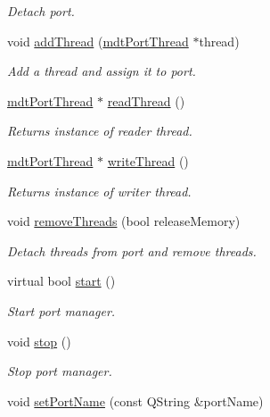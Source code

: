\begin{DoxyCompactItemize}
\begin{DoxyCompactList}\small\item\em Detach port. \end{DoxyCompactList}\item 
void \hyperlink{classmdt_port_manager_ab62591409d019a4a2576b4310c411b8f}{addThread} (\hyperlink{classmdt_port_thread}{mdtPortThread} $\ast$thread)
\begin{DoxyCompactList}\small\item\em Add a thread and assign it to port. \end{DoxyCompactList}\item 
\hyperlink{classmdt_port_thread}{mdtPortThread} $\ast$ \hyperlink{classmdt_port_manager_ad9233b5156a45f2684783317d75fdf9b}{readThread} ()
\begin{DoxyCompactList}\small\item\em Returns instance of reader thread. \end{DoxyCompactList}\item 
\hyperlink{classmdt_port_thread}{mdtPortThread} $\ast$ \hyperlink{classmdt_port_manager_af44b6e9876e6687b1d4fe7e05ffd5a91}{writeThread} ()
\begin{DoxyCompactList}\small\item\em Returns instance of writer thread. \end{DoxyCompactList}\item 
void \hyperlink{classmdt_port_manager_aaa0a474183bcae0fff4fb9ef43023c25}{removeThreads} (bool releaseMemory)
\begin{DoxyCompactList}\small\item\em Detach threads from port and remove threads. \end{DoxyCompactList}\item 
virtual bool \hyperlink{classmdt_port_manager_af1fb103ffafc227337a59c7e82f44fbc}{start} ()
\begin{DoxyCompactList}\small\item\em Start port manager. \end{DoxyCompactList}\item 
void \hyperlink{classmdt_port_manager_aacbf87cc3d9c37c87e21696f8a6514bd}{stop} ()
\begin{DoxyCompactList}\small\item\em Stop port manager. \end{DoxyCompactList}\item 
void \hyperlink{classmdt_port_manager_a2b2ed690cbba9f544c6ac1b46684e59a}{setPortName} (const QString \&portName)

\end{DoxyCompactItemize}
